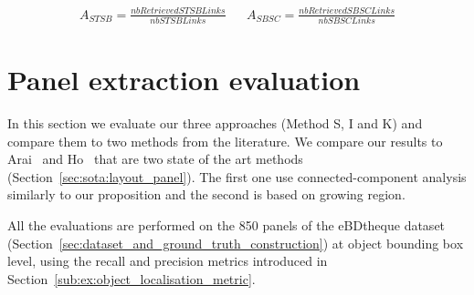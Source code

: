 \begin{align}
\label{eq:ex:accuracy_semantic_links}
A_{STSB} = \frac{nbRetrievedSTSBLinks}{nbSTSBLinks} && A_{SBSC} = \frac{nbRetrievedSBSCLinks}{nbSBSCLinks}
\end{align}








\section{Panel extraction evaluation} %
\label{sub:ex:panel_extraction_evaluation}

In this section we evaluate our three approaches (Method S, I and K) and compare them to two methods from the literature.
We compare our results to Arai~\cite{Arai10} and Ho~\cite{Ho2012} that are two state of the art methods (Section~\ref{sec:sota:layout_panel}).
The first one use connected-component analysis similarly to our proposition and the second is based on growing region.

All the evaluations are performed on the 850 panels of the eBDtheque dataset (Section~\ref{sec:dataset_and_ground_truth_construction}) at object bounding box level, using the recall and precision metrics introduced in Section~\ref{sub:ex:object_localisation_metric}.


